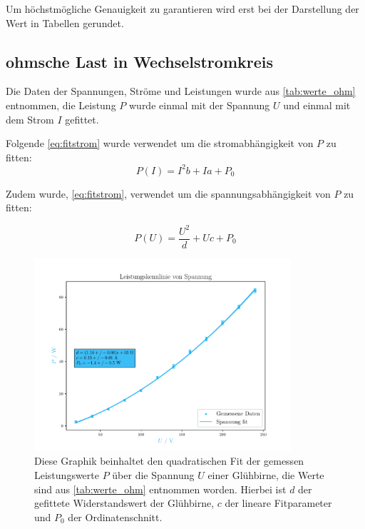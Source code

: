 \documentclass[12pt,english,ngerman]{scrartcl}
\begin{document}
Um höchstmögliche Genauigkeit zu garantieren wird erst bei der Darstellung der
Wert in Tabellen gerundet.

\subsection{ohmsche Last in Wechselstromkreis}
Die Daten der Spannungen, Ströme und Leistungen wurde aus
\autoref{tab:werte_ohm} entnommen, die Leistung $P$ wurde einmal mit der
Spannung $U$ und einmal mit dem Strom $I$ gefittet.

Folgende \autoref{eq:fitstrom} wurde verwendet um die stromabhängigkeit von $P$
zu fitten:
\begin{equation}
	P(I) = I^{2} b + I a + P_0
	\label{eq:fitstrom}
\end{equation}

Zudem wurde, \autoref{eq:fitstrom}, verwendet um die spannungsabhängigkeit von
$P$ zu fitten:

\begin{equation}
	P(U) = \frac{U^{2}}{d} + U c + P_0
	\label{eq:fitspannung}
\end{equation}

\begin{figure}[H]
	\begin{center}
		\includegraphics[width = 0.85\textwidth]{figures/pUkennlinie.pdf}
	\end{center}
	\caption[Spannungsabhängige Leistungskurve einer Glühbirne]{ Diese Graphik beinhaltet
		den quadratischen Fit der gemessen Leistungswerte $P$ über die Spannung $U$
		einer Glühbirne, die Werte sind aus \autoref{tab:werte_ohm} entnommen worden.
		Hierbei ist $d$ der gefittete Widerstandswert der Glühbirne, $c$ der lineare
		Fitparameter und $P_0$ der Ordinatenschnitt.
	}\label{fig:pUkennlinie}
\end{figure}
\end{document}
